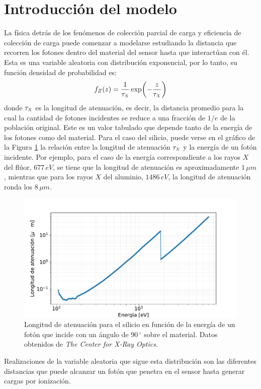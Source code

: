 \section{Introducción del modelo}
\noindent La física detrás de los fenómenos de colección parcial de carga y eficiencia de colección de carga puede comenzar a modelarse estudiando la distancia que recorren los fotones dentro del material del sensor hasta que interactúan con él. Esta es una variable aleatoria con distribución exponencial, por lo tanto, su función densidad de probabilidad es:
\begin{equation}
    f_{Z}(z) = \frac{1}{\tau_{\scaleto{X}{4pt}}}\exp(-\frac{z}{\tau_{\scaleto{X}{4pt}}})
        \label{ec:DistribucionDistancias}
\end{equation}
donde $\tau_{\scaleto{X}{4pt}}$ es la longitud de atenuación, es decir, la distancia promedio para la cual la cantidad de fotones incidentes se reduce a una fracción de $1/e$ de la población original. Este es un valor tabulado que depende tanto de la energía de los fotones como del material. Para el caso del silicio, puede verse en el gráfico de la Figura \ref{fig:Attenuation} la relación entre la longitud de atenuación $\tau_{\scaleto{X}{4pt}}$ y la energía de un fotón incidente. Por ejemplo, para el caso de la energía correspondiente a los rayos $X$ del flúor, $677\,\si{eV}$, se tiene que la longitud de atenuación es aproximadamente $1\,\si{\mu m}$, mientras que para los rayos $X$ del aluminio, $1486\,\si{eV}$, la longitud de atenuación ronda los $8\,\si{\mu m}$.
\begin{figure}[h]
    \centering
        \includegraphics[scale=0.5]{Figs/AttenuationLength.pdf}
    \caption{Longitud de atenuación para el silicio en función de la energía de un fotón que incide con un ángulo de $90\,^{\circ}$ sobre el material. Datos obtenidos de \textit{The Center for X-Ray Optics}\cite{AttenuationLength}.}
    \label{fig:Attenuation}
\end{figure}
Realizaciones de la variable aleatoria que sigue esta distribución son las diferentes distancias que puede alcanzar un fotón que penetra en el sensor hasta generar cargas por ionización.

